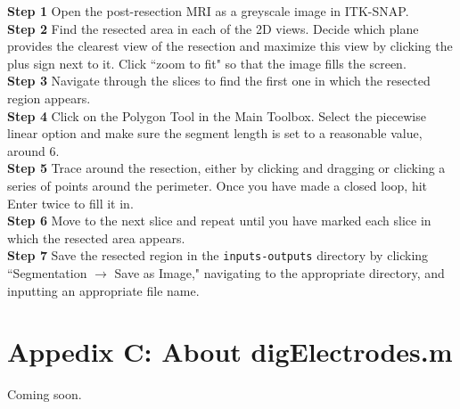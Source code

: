 \documentclass[12pt]{article}
\begin{document}
\textbf{Step 1} Open the post-resection MRI as a greyscale image in ITK-SNAP. \\
\textbf{Step 2} Find the resected area in each of the 2D views. Decide which plane provides the clearest view of the resection and maximize this view by clicking the plus sign next to it. Click ``zoom to fit" so that the image fills the screen.\\
\textbf{Step 3} Navigate through the slices to find the first one in which the resected region appears. \\
\textbf{Step 4} Click on the Polygon Tool in the Main Toolbox. Select the piecewise linear option and make sure the segment length is set to a reasonable value, around 6. \\
\textbf{Step 5} Trace around the resection, either by clicking and dragging or clicking a series of points around the perimeter. Once you have made a closed loop, hit Enter twice to fill it in. \\
\textbf{Step 6} Move to the next slice and repeat until you have marked each slice in which the resected area appears. \\
\textbf{Step 7} Save the resected region in the \texttt{inputs-outputs} directory by clicking ``Segmentation $\rightarrow$ Save as Image," navigating to the appropriate directory, and inputting an appropriate file name. \\

\section*{Appedix C: About digElectrodes.m}
Coming soon.
\end{document}
